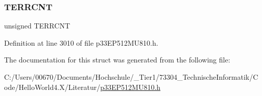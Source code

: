 \subsubsection{\texorpdfstring{T\+E\+R\+R\+C\+NT}{TERRCNT}}
{\footnotesize\ttfamily unsigned T\+E\+R\+R\+C\+NT}



Definition at line 3010 of file p33\+E\+P512\+M\+U810.\+h.



The documentation for this struct was generated from the following file\+:\begin{DoxyCompactItemize}
\item 
C\+:/\+Users/00670/\+Documents/\+Hochschule/\+\_\+\+Tier1/73304\+\_\+\+Technische\+Informatik/\+Code/\+Hello\+World4.\+X/\+Literatur/\hyperlink{p33_e_p512_m_u810_8h}{p33\+E\+P512\+M\+U810.\+h}\end{DoxyCompactItemize}
